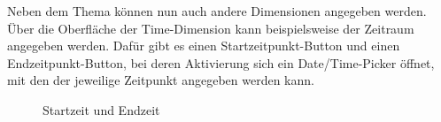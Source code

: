 \newpage
Neben dem Thema können nun auch andere Dimensionen angegeben werden. Über die Oberfläche der Time-Dimension kann beispielsweise der Zeitraum angegeben werden. Dafür gibt es einen Startzeitpunkt-Button und einen Endzeitpunkt-Button, bei deren Aktivierung sich ein Date/Time-Picker öffnet, mit den der jeweilige Zeitpunkt angegeben werden kann.\newline
\hspace*{0cm}
\begin{minipage}{0.47\linewidth}
	\begin{figure}[H]
		\centering
		\caption{Startzeit und Endzeit}
		\label{fig:time1}
	\end{figure}
\end{minipage}
